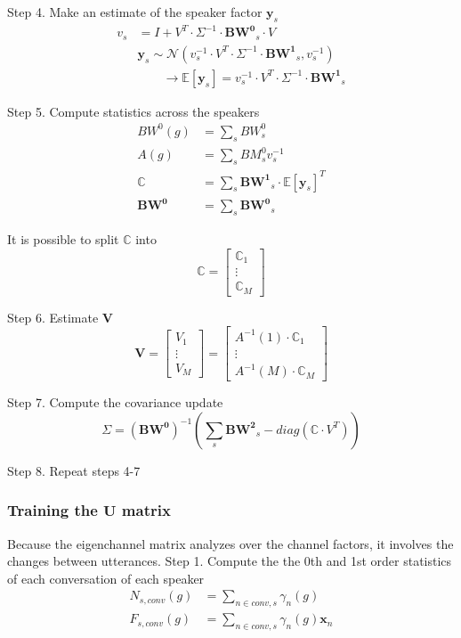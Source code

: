 Step 4. Make an estimate of the speaker factor $\bm{y}_s$
\begin{align*}
    v_s &= I + V^T \cdot \Sigma^{-1} \cdot \bm{BW^0}_s \cdot V \\
    &\bm{y}_s \sim \mathcal{N}(v_s^{-1} \cdot V^T \cdot \Sigma^{-1} \cdot \bm{BW^1}_s , v_s^{-1}) \\
    &\quad \quad \rightarrow \mathbb{E}[\bm{y}_s] = v_s^{-1} \cdot V^T \cdot \Sigma^{-1} \cdot \bm{BW^1}_s
\end{align*}

Step 5. Compute statistics across the speakers
\begin{align*}
    BW^0(g) &= \sum_s BW^0_s \\
    A(g) &= \sum_s BM^0_s v_s^{-1} \\
    \mathbb{C} &= \sum_s \bm{BW^1}_s \cdot \mathbb{E}[\bm{y}_s]^T \\
    \bm{BW^0} &= \sum_s \bm{BW^0}_s
\end{align*}

It is possible to split $\mathbb{C}$ into
$$\mathbb{C} = \begin{bmatrix} \mathbb{C}_1 \\ \vdots \\ \mathbb{C}_M \end{bmatrix} $$

Step 6. Estimate $\bm{V}$
$$\bm{V} = \begin{bmatrix} V_1 \\ \vdots \\ V_M \end{bmatrix} = \begin{bmatrix} A^{-1}(1) \cdot \mathbb{C}_1 \\ \vdots \\  A^{-1}(M) \cdot \mathbb{C}_M  \end{bmatrix}$$

Step 7. Compute the covariance update
$$\Sigma = (\bm{BW^0})^{-1} \left( \sum_s \bm{BW^2}_s - diag(\mathbb{C}\cdot V^T) \right)$$

Step 8. Repeat steps 4-7

\subsubsection{Training the $\bm{U}$ matrix}
Because the eigenchannel matrix analyzes over the channel factors, it involves the changes between utterances.
Step 1. Compute the the 0th and 1st order statistics of each conversation of each speaker
\begin{align*}
    N_{s,conv}(g) &= \sum_{n \in conv,s} \gamma_n (g) \\
    F_{s,conv}(g) &= \sum_{n \in conv,s} \gamma_n(g) \bm{x}_n
\end{align*}

